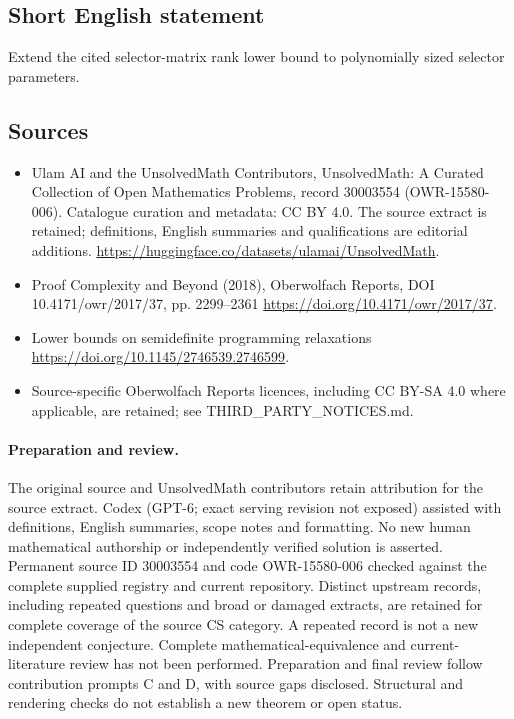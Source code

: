 \documentclass[11pt]{article}
\begin{document}
\subsection{Short English statement}
Extend the cited selector-matrix rank lower bound to polynomially sized selector parameters.
\subsection{Sources}
\begin{itemize}
\item[\hypertarget{source:30003554:1}{S1}] Ulam AI and the UnsolvedMath Contributors, UnsolvedMath: A Curated Collection of Open Mathematics Problems, record 30003554 (OWR-15580-006). Catalogue curation and metadata: CC BY 4.0. The source extract is retained; definitions, English summaries and qualifications are editorial additions.
\url{https://huggingface.co/datasets/ulamai/UnsolvedMath}.
\item[\hypertarget{source:30003554:2}{S2}] Proof Complexity and Beyond (2018), Oberwolfach Reports, DOI 10.4171/owr/2017/37, pp. 2299--2361
\url{https://doi.org/10.4171/owr/2017/37}.
\item[\hypertarget{source:30003554:3}{S3}] Lower bounds on semidefinite programming relaxations
\url{https://doi.org/10.1145/2746539.2746599}.
\item Source-specific Oberwolfach Reports licences, including CC BY-SA 4.0 where applicable, are retained; see THIRD\_PARTY\_NOTICES.md.
\end{itemize}
\paragraph{Preparation and review.}
The original source and UnsolvedMath contributors retain attribution for the source extract. Codex (GPT-6; exact serving revision not exposed) assisted with definitions, English summaries, scope notes and formatting. No new human mathematical authorship or independently verified solution is asserted. Permanent source ID 30003554 and code OWR-15580-006 checked against the complete supplied registry and current repository. Distinct upstream records, including repeated questions and broad or damaged extracts, are retained for complete coverage of the source CS category. A repeated record is not a new independent conjecture. Complete mathematical-equivalence and current-literature review has not been performed. Preparation and final review follow contribution prompts C and D, with source gaps disclosed. Structural and rendering checks do not establish a new theorem or open status.
\label{end:30003554}
\end{document}
